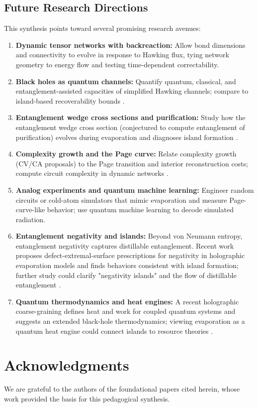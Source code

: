 \documentclass[12pt, numbers, sort&compress]{article}
\begin{document}
\subsection*{Future Research Directions}
This synthesis points toward several promising research avenues:
\begin{enumerate}
    \item \textbf{Dynamic tensor networks with backreaction:} Allow bond dimensions and connectivity to evolve in response to Hawking flux, tying network geometry to energy flow and testing time-dependent correctability.
    \item \textbf{Black holes as quantum channels:} Quantify quantum, classical, and entanglement-assisted capacities of simplified Hawking channels; compare to island-based recoverability bounds \cite{Akers:2025capacity}.
    \item \textbf{Entanglement wedge cross sections and purification:} Study how the entanglement wedge cross section (conjectured to compute entanglement of purification) evolves during evaporation and diagnoses island formation \cite{Takayanagi:2018eop}.
    \item \textbf{Complexity growth and the Page curve:} Relate complexity growth (CV/CA proposals) to the Page transition and interior reconstruction costs; compute circuit complexity in dynamic networks \cite{Carmi:2017hc}.
    \item \textbf{Analog experiments and quantum machine learning:} Engineer random circuits or cold-atom simulators that mimic evaporation and measure Page-curve-like behavior; use quantum machine learning to decode simulated radiation.
    \item \textbf{Entanglement negativity and islands:} Beyond von Neumann entropy, entanglement negativity captures distillable entanglement. Recent work proposes defect-extremal-surface prescriptions for negativity in holographic evaporation models and finds behaviors consistent with island formation; further study could clarify "negativity islands" and the flow of distillable entanglement \cite{Shao:2024negativity}.
    \item \textbf{Quantum thermodynamics and heat engines:} A recent holographic coarse-graining defines heat and work for coupled quantum systems and suggests an extended black-hole thermodynamics; viewing evaporation as a quantum heat engine could connect islands to resource theories \cite{Shigemura:2024heatwork}.
\end{enumerate}

\section*{Acknowledgments}
We are grateful to the authors of the foundational papers cited herein, whose work provided the basis for this pedagogical synthesis.



\end{document}
